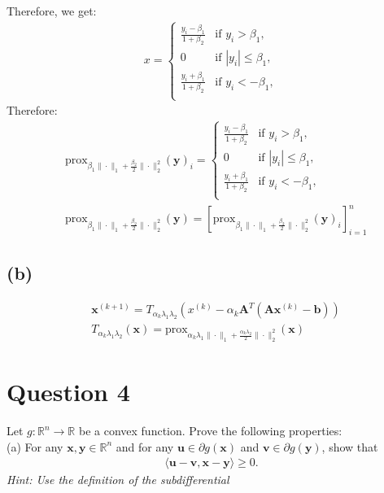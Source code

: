 \documentclass{article}
\newcommand{\R}{\mathbb{R}}
\begin{document}
\noindent
Therefore, we get:
\begin{align*}
    x = \begin{cases}
        \frac{y_i - \beta_1}{1 + \beta_2} &\text{if } y_i > \beta_1, \\
        0 &\text{if } |y_i| \leq \beta_1, \\
        \frac{y_i + \beta_1}{1 + \beta_2} &\text{if } y_i < -\beta_1, \\
    \end{cases}
\end{align*}
Therefore:
\begin{align*}
    &\text{prox}_{\beta_1\|\cdot\|_1 + \frac{\beta_2}{2}\|\cdot\|_2^2}(\bm{y})_i = \begin{cases}
        \frac{y_i - \beta_1}{1 + \beta_2} &\text{if } y_i > \beta_1, \\
        0 &\text{if } |y_i| \leq \beta_1, \\
        \frac{y_i + \beta_1}{1 + \beta_2} &\text{if } y_i < -\beta_1, \\
    \end{cases}\\
    &\text{prox}_{\beta_1\|\cdot\|_1 + \frac{\beta_2}{2}\|\cdot\|_2^2}(\bm{y}) = [\text{prox}_{\beta_1\|\cdot\|_1 + \frac{\beta_2}{2}\|\cdot\|_2^2}(\bm{y})_i]_{i = 1}^{n}
\end{align*}


\subsection*{(b)}
\begin{align*}
    &\bm{x}^{(k+1)} = T_{\alpha_k \lambda_1 \lambda_2} \left(x^{(k)} - \alpha_k \bm{A}^T(\bm{A}\bm{x}^{(k)} - \bm{b}) \right) \\
    &T_{\alpha_k \lambda_1 \lambda_2}(\bm{x}) = \text{prox}_{\alpha_k\lambda_1\|\cdot\|_1 + \frac{\alpha_k\lambda_2}{2}\|\cdot\|_2^2}(\bm{x})
\end{align*}



\section*{Question 4}
Let \(g: \R^n \to \R\) be a convex function. Prove the following properties: \\
(a) For any \(\bm{x}, \bm{y} \in \R^n\) and for any \(\bm{u} \in \partial g(\bm{x})\) and \(\bm{v} \in \partial g(\bm{y})\), show that
\begin{align*}
    \langle \bm{u} - \bm{v}, \bm{x} - \bm{y}\rangle \geq 0.
\end{align*}
\textit{Hint: Use the definition of the subdifferential}
\end{document}
